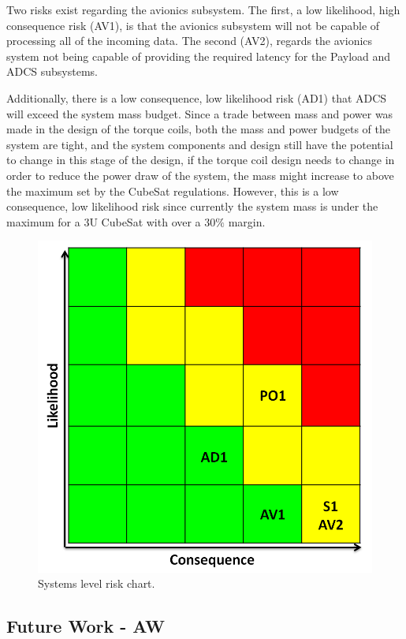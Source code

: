 \documentclass[12pt]{article}
\begin{document}
Two risks exist regarding the avionics subsystem.  The first, a low likelihood, high consequence risk (AV1), is that the avionics subsystem will not be capable of processing all of the incoming data.  The second (AV2), regards the avionics system not being capable of providing the required latency for the Payload and ADCS subsystems. 

Additionally, there is a low consequence, low likelihood risk (AD1) that ADCS will exceed the system mass budget.  Since a trade between mass and power was made in the design of the torque coils, both the mass and power budgets of the system are tight, and the system components and design still have the potential to change in this stage of the design, if the torque coil design needs to change in order to reduce the power draw of the system, the mass might increase to above the maximum set by the CubeSat regulations.  However, this is a low consequence, low likelihood risk since currently the system mass is under the maximum for a 3U CubeSat with over a $30\%$ margin.

\begin{figure}[h]
\centering
\includegraphics{images/conclusion_1.png}
\caption{Systems level risk chart.}
\label{fig:risk_chart}
\end{figure}

		\subsection{Future Work - AW}
\end{document}
